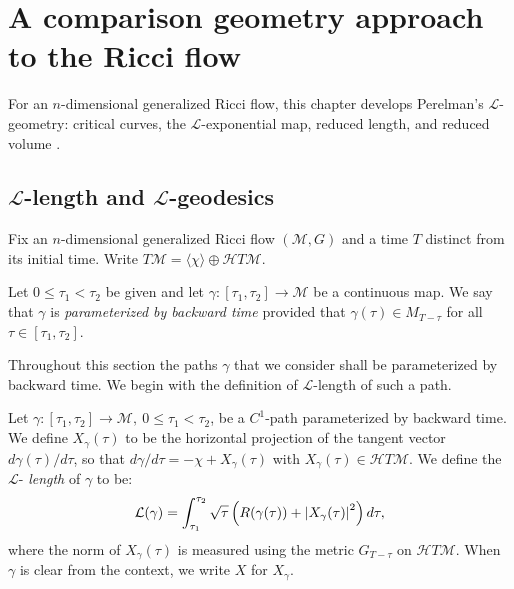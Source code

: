 \chapter{A comparison geometry approach to the Ricci flow}\label{chap:comparison-geometry}
\label{lengthfn}

For an $n$-dimensional generalized Ricci flow, this chapter develops
Perelman's ${\mathcal L}$-geometry: critical curves, the
${\mathcal L}$-exponential map, reduced length, and reduced volume
\cite{Perelman1}.


\section{${\mathcal L}$-length and ${\mathcal L}$-geodesics}

Fix an $n$-dimensional generalized Ricci flow $({\mathcal M},G)$ and
a time $T$ distinct from its initial time. Write
$T{\mathcal M}=\langle\chi\rangle\oplus {\mathcal HT}{\mathcal M}$.


\begin{definition}\label{def:parameterized-by-backward-time}

Let $0\le \tau_1<\tau_2$ be given and let $\gamma\colon
[\tau_1,\tau_2]\to {\mathcal M}$ be a continuous map. We say that
$\gamma$ is {\em parameterized by backward time} provided that $\gamma(\tau)\in M_{T-\tau}$ for all
$\tau\in [\tau_1,\tau_2]$.
\end{definition}


Throughout this section the paths $\gamma$ that we consider shall be
parameterized by backward time. We begin with the definition of
${\mathcal L}$-length of such a path.

\begin{definition}\label{def:l-length}
\label{Llength}

Let  $\gamma\colon [\tau_{1},\tau_{2}]\rightarrow {\mathcal M},\ 0
\le \tau_{1} < \tau_{2}$, be a  $C^{1}$-path parameterized by
backward time. We define $X_\gamma(\tau)$ to be the horizontal
projection of the tangent vector $d\gamma(\tau)/d\tau$, so that
$d\gamma/d\tau=-\chi+X_\gamma(\tau)$ with $X_\gamma(\tau)\in
{\mathcal HT}{\mathcal M}$. We define the $\mathcal{L}$-{\em
length} of $\gamma$ to be:
$$\mathcal{L}(\gamma) = \int_{\tau_{1}}^{\tau_{2}}
\sqrt{\tau}\left(R(\gamma(\tau)) +
\left\vert X_\gamma(\tau)\right\vert^{2}\right)d\tau,$$
where the norm of $X_\gamma(\tau)$ is measured using the metric
$G_{T-\tau}$ on ${\mathcal HT}{\mathcal M}$. When $\gamma$ is clear
from the context, we write $X$ for $X_\gamma$.
\end{definition}



